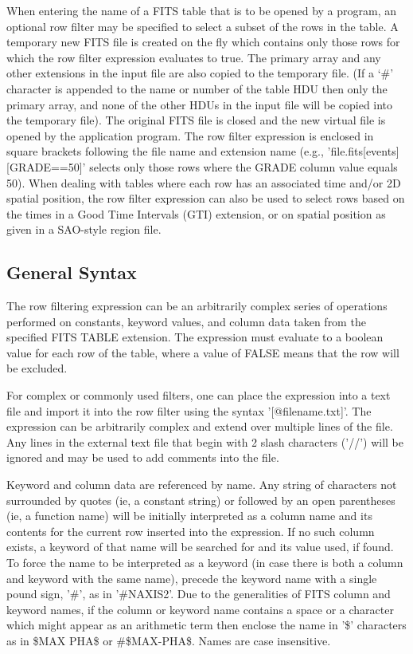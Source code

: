 \documentclass[11pt]{book}
\begin{document}
    When entering the name of a FITS table that is to be opened by a
    program, an optional row filter may be specified to select a subset
    of the rows in the table.  A temporary new FITS file is created on
    the fly which contains only those rows for which the row filter
    expression evaluates to true.  The primary array and any other
    extensions in the input file are also copied to the temporary
    file.
(If a `\#' character is appended to the name or number of the
table HDU then only the primary array, and none of the other
HDUs in the input file will be copied into the temporary file).
    The original FITS file is closed and the new virtual file
    is opened by the application program.  The row filter expression is
    enclosed in square brackets following the file name and extension
    name (e.g., 'file.fits[events][GRADE==50]'  selects only those rows
    where the GRADE column value equals 50).   When dealing with tables
    where each row has an associated time and/or 2D spatial position,
    the row filter expression can also be used to select rows based on
    the times in a Good Time Intervals (GTI) extension, or on spatial
    position as given in a SAO-style region file.


\subsection{General Syntax}

    The row filtering  expression can be an arbitrarily  complex series
    of operations performed  on constants,  keyword values,  and column
    data taken from the specified FITS TABLE extension.  The expression
    must evaluate to a boolean  value for each row  of the table, where
    a value of FALSE means that the row will be excluded.

    For complex or commonly  used filters, one can place the expression
    into a text file and import it into the row filter using the syntax
    '[@filename.txt]'.  The expression can be  arbitrarily complex and
    extend over multiple lines of the file.  Any lines in the external
    text file that begin with 2 slash characters ('//') will be ignored
    and may be used to add comments into the file.

    Keyword and   column data  are referenced by   name.  Any  string of
    characters not surrounded by    quotes (ie, a constant  string)   or
    followed by   an open parentheses (ie,   a  function name)   will be
    initially interpreted   as a column  name and  its contents for the
    current row inserted into the expression.  If no such column exists,
    a keyword of that  name will be searched for  and its value used, if
    found.  To force the  name to be  interpreted as a keyword (in case
    there is both a column and keyword with the  same name), precede the
    keyword name with a single pound sign, '\#', as in '\#NAXIS2'.  Due to
    the generalities of FITS column and  keyword names, if the column or
    keyword name  contains a space or a  character which might appear as
    an arithmetic  term then enclose  the  name in '\$'  characters as in
    \$MAX PHA\$ or \#\$MAX-PHA\$.  Names are case insensitive.
\end{document}

